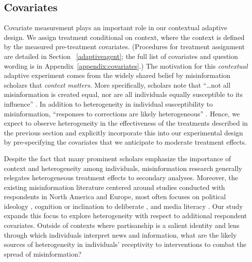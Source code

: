 \documentclass[letterpaper, 12pt, parskip=full,]{scrartcl}
\begin{document}


\subsection{Covariates}

Covariate measurement plays an important role in our contextual adaptive design. We assign treatment conditional on context, where the context is defined by the measured pre-treatment covariates. (Procedures for treatment assignment are detailed in Section ~\ref{adaptiveagent}; the full list of covariates and question wording is in Appendix~\ref{appendix:covariates}.)
The motivation for this \textit{contextual} adaptive experiment comes from the widely shared belief by misinformation scholars that \textit{context matters.} More specifically, scholars note that ``\dots not all misinformation is created equal, nor are all individuals equally susceptible to its influence'' \citep{wittenberg2020misinformation}. In addition to heterogeneity in individual susceptibility to misinformation, ``responses to corrections are likely heterogeneous'' \citep{swire2020searching}. Hence, we expect to observe heterogeneity in the effectiveness of the treatments described in the previous section and explicitly incorporate this into our experimental design by pre-specifying the covariates that we anticipate to moderate treatment effects.

Despite the fact that many prominent scholars emphasize the importance of context and heterogeneity among individuals, misinformation research generally relegates heterogeneous treatment effects to secondary analyses. Moreover, the existing misinformation literature centered around studies conducted with respondents in North America and Europe, most often focuses on political ideology \citep{pennycook_epstein_mosleh_arechar_eckles_rand_2019}, cognition or inclination to deliberate \citep{bago2020fake}, and media literacy \citep{guessetal2020digital}. Our study expands this focus to explore heterogeneity with respect to additional respondent covariates. Outside of contexts where partisanship is a salient identity and lens through which individuals interpret news and information, what are the likely sources of heterogeneity in individuals' receptivity to interventions to combat the spread of misinformation?
\end{document}
